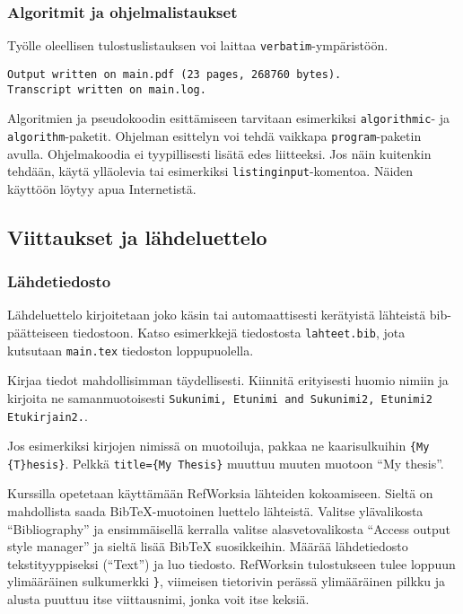 \subsubsection{Algoritmit ja ohjelmalistaukset}

Työlle oleellisen tulostuslistauksen voi laittaa
\verb!verbatim!-ympäristöön.
%
\begin{verbatim}
Output written on main.pdf (23 pages, 268760 bytes).
Transcript written on main.log.
\end{verbatim}
%
\begin{sloppypar}
Algoritmien ja pseudokoodin esittämiseen tarvitaan esimerkiksi
\verb!algorithmic!- ja \verb!algorithm!-paketit.  Ohjelman esittelyn
voi tehdä vaikkapa \verb!program!-paketin avulla.  Ohjelmakoodia ei
tyypillisesti lisätä edes liitteeksi.  Jos näin kuitenkin tehdään,
käytä ylläolevia tai esimerkiksi \verb!listinginput!-komentoa. Näiden
käyttöön löytyy apua Internetistä.
\end{sloppypar}

\subsection{Viittaukset ja lähdeluettelo}
\label{sec:esimviitteet}

\subsubsection{Lähdetiedosto}
\label{sec:esimlahdetiedosto}

Lähdeluettelo kirjoitetaan joko käsin tai automaattisesti
kerätyistä lähteistä bib-päät\-tei\-seen tiedostoon. Katso 
esimerkkejä tiedostosta \verb!lahteet.bib!, jota kutsutaan
\verb!main.tex! tiedoston loppupuolella. 

Kirjaa tiedot mahdollisimman täydellisesti. Kiinnitä erityisesti
huomio nimiin ja kirjoita ne samanmuotoisesti
\verb!Sukunimi, Etunimi and Sukunimi2, Etunimi2 Etukirjain2.!.

Jos esimerkiksi kirjojen nimissä on muotoiluja, pakkaa ne
kaarisulkuihin \verb!{My {T}hesis}!. 
Pelkkä \verb!title={My Thesis}! muuttuu muuten
muotoon ``My thesis''.

Kurssilla opetetaan käyttämään RefWorksia lähteiden kokoamiseen.
Sieltä on mahdollista saada BibTeX-muotoinen luettelo lähteistä.
Valitse ylävalikosta ``Bibliography'' ja ensimmäisellä kerralla
valitse alasvetovalikosta ``Access output style manager'' ja
sieltä lisää BibTeX suosikkeihin. Määrää lähdetiedosto tekstityyppiseksi
(``Text'') ja luo tiedosto. RefWorksin tulostukseen tulee loppuun
ylimääräinen sulkumerkki \verb!}!, viimeisen tietorivin perässä
ylimääräinen pilkku ja alusta puuttuu itse viittausnimi, jonka
voit itse keksiä.

